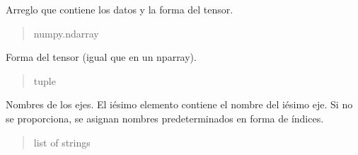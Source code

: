 \documentclass[letterpaper,10pt,english]{sphinxmanual}
\begin{document}
\begin{fulllineitems}
\begin{quote}
\begin{description}
\begin{itemize}
\end{itemize}

\end{description}\end{quote}

\begin{fulllineitems}
\label{\detokenize{utils.tensor:utils.tensor.Tensor.array}}
\pysigstartsignatures
{}
\pysigstopsignatures
\sphinxAtStartPar
Arreglo que contiene los datos y la forma del tensor.
\begin{quote}\begin{description}
\sphinxAtStartPar
numpy.ndarray

\end{description}\end{quote}

\end{fulllineitems}


\begin{fulllineitems}
\label{\detokenize{utils.tensor:utils.tensor.Tensor.shape}}
\pysigstartsignatures
{}
\pysigstopsignatures
\sphinxAtStartPar
Forma del tensor (igual que en un nparray).
\begin{quote}\begin{description}
\sphinxAtStartPar
tuple

\end{description}\end{quote}

\end{fulllineitems}


\begin{fulllineitems}
\label{\detokenize{utils.tensor:utils.tensor.Tensor.axis}}
\pysigstartsignatures
{}
\pysigstopsignatures
\sphinxAtStartPar
Nombres de los ejes. El i\sphinxhyphen{}ésimo elemento contiene el nombre del i\sphinxhyphen{}ésimo eje.
Si no se proporciona, se asignan nombres predeterminados en forma de índices.
\begin{quote}\begin{description}
\sphinxAtStartPar
list of strings


\end{description}
\end{quote}
\end{fulllineitems}
\end{fulllineitems}
\end{document}
